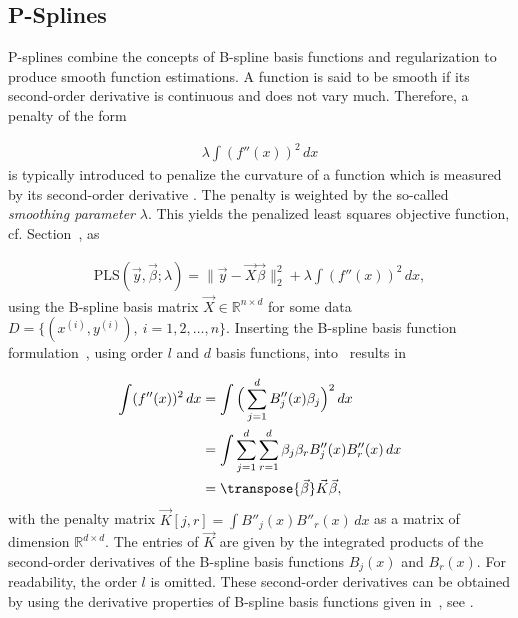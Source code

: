 \subsection{P-Splines} \label{subsec:p-splines}

P-splines combine the concepts of B-spline basis functions and regularization to produce smooth function estimations. A function is said to be smooth if its second-order derivative is continuous and does not vary much. Therefore, a penalty of the form 

\begin{align} \label{eq:wiggliness-penalty}
	\lambda \int (f''(x))^2 \,dx
\end{align}
%
is typically introduced to penalize the curvature of a function which is measured by its second-order derivative \cite{osullivan1986penalties}. The penalty is weighted by the so-called \emph{smoothing parameter} $\lambda$. This yields the penalized least squares objective function, cf. Section~, as

\begin{align} \label{eq:P-splines-OF-base}
	\text{PLS}(\vec{y}, \vec{\beta}; \lambda) = \lVert \vec{y} - \vec{X} \vec{\beta} \rVert_2^2 + \lambda \int (f''(x))^2 \,dx,
\end{align}
%
using the B-spline basis matrix $\vec{X} \in \mathbb{R}^{n \times d}$ for some data $D=\{(x^{(i)}, y^{(i)}), \ i=1,2,\dots,n\}$. Inserting the B-spline basis function formulation~, using order $l$ and $d$ basis functions, into~ results in

\begin{align}
	\begin{split}
		\int (f''(x))^2 \,dx &= \int \Big(\sum_{j=1}^d B''_j(x) \beta_j \Big)^2 \,dx \\
						     &= \int \sum_{j=1}^d \sum_{r=1}^d \beta_j \beta_r B''_j(x) B''_r(x) \,dx \\
						     &= \transpose{\vec{\beta}} \vec{K} \vec{\beta},
	\end{split}
\end{align}
% 
with the penalty matrix $\vec{K}[j,r] = \int B''_j(x) B''_r(x) \,dx$ as a matrix of dimension $\mathbb{R}^{d \times d}$. The entries of $\vec{K}$ are given by the integrated products of the second-order derivatives of the B-spline basis functions $B_j(x)$ and $B_r(x)$. For readability, the order $l$ is omitted. These second-order derivatives can be obtained by using the derivative properties of B-spline basis functions given in~, see \cite{fahrmeir2007regression}. 


